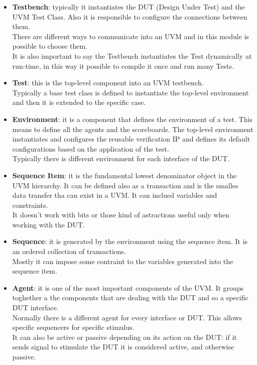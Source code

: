 \begin{itemize}
    \item \textbf{Testbench}: typically it instantiates the DUT (Design Under Test) and the UVM Test Class. Also it is responsible to configure the connections between them.\\
    There are different ways to communicate into an UVM and in this module is possible to choose them.\\
    It is also important to say the Testbench instantiates the Test dynamically at run-time, in this way it possible to compile it once and run many Tests.
    
    \item \textbf{Test}: this is the top-level component into an UVM testbench.\\
    Typically a base test class is defined to instantiate the top-level environment and then it is extended to the specific case.
    
    \item \textbf{Environment}: it is a component that defines the environment of a test. This means to define all the agents and the scoreboards. 
    The top-level environment instantiates and configures the reusable verification IP and defines its default configurations based on the application of the test.\\
    
    Typically there is different environment for each interface of the DUT.
    
    \item \textbf{Sequence Item}: it is the fundamental lowest denominator object in the UVM hierarchy. It can be defined also as a transaction and is the smalles data transfer tha can exist in a UVM. It can inclued variables and constraints.\\
    
    It doesn't work with bits or those kind of astractions useful only when working with the DUT.
    
    \item \textbf{Sequence}: it is generated by the environment using the sequence item. It is an ordered collection of transactions.\\
    Mostly it can impose some contraint to the variables generated into the sequence item.
    
    \item \textbf{Agent}: it is one of the most important components of the UVM. It groups toghether a the components that are dealing with the DUT and so a specific DUT interface.\\
    Normally there is a different agent for every interface or DUT. This allows specific sequencers for specific stimulus.\\
    It can also be active or passive depending on its action on the DUT: if it sends signal to stimulate the DUT it is considered active, and otherwise passive.
    

\end{itemize}
